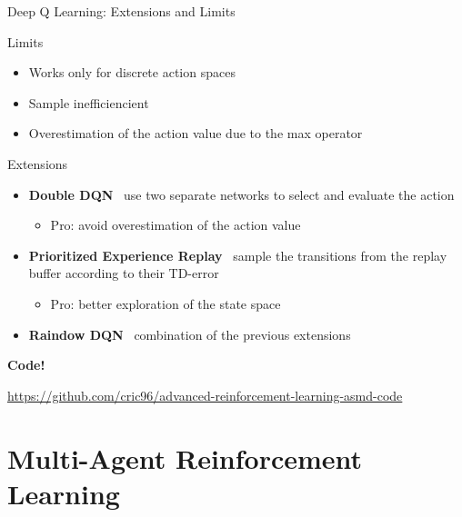 \documentclass[presentation, 9pt]{beamer}\mode<presentation>{\usetheme{AMSBolognaFC}}
\begin{document}
\begin{frame}{Deep Q Learning: Extensions and Limits}
	\begin{block}{Limits}
		\begin{itemize}
			\item Works only for discrete action spaces
			\item Sample inefficiencient
			\item Overestimation of the action value due to the max operator
		\end{itemize}
	\end{block}
	\begin{block}{Extensions}
		\begin{itemize}
			\item \textbf{Double DQN} \faArrowRight \, use two separate networks to select and evaluate the action
			\begin{itemize}
				\item Pro: avoid overestimation of the action value
			\end{itemize}
			\item \textbf{Prioritized Experience Replay} \faArrowRight \, sample the transitions from the replay buffer according to their TD-error
			\begin{itemize}
				\item Pro: better exploration of the state space
			\end{itemize}
			\item \textbf{Raindow DQN} \faArrowRight \, combination of the previous extensions
		\end{itemize}
	\end{block}
\end{frame}
\begin{frame}[plain]
\begin{center}
	\Huge{\textbf{Code!}}
\end{center}
\centering
\small{\url{https://github.com/cric96/advanced-reinforcement-learning-asmd-code}}
\end{frame}
\section{Multi-Agent Reinforcement Learning}
\end{document}
